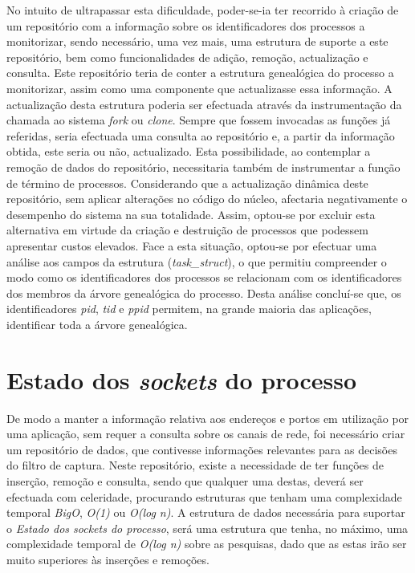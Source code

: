 No intuito de ultrapassar esta dificuldade, poder-se-ia ter recorrido à criação de um repositório com a informação sobre os identificadores dos processos a monitorizar, sendo necessário, uma vez mais, uma estrutura de suporte a este repositório, bem como funcionalidades de adição, remoção, actualização e consulta.
Este repositório teria de conter a estrutura genealógica do processo a monitorizar, assim como uma componente que actualizasse essa informação.
A actualização desta estrutura poderia ser efectuada através da instrumentação da chamada ao sistema \textit{fork} ou \textit{clone}.
Sempre que fossem invocadas as funções já referidas, seria efectuada uma consulta ao repositório e, a partir da informação obtida, este seria ou não, actualizado.
Esta possibilidade, ao contemplar a remoção de dados do repositório, necessitaria também de instrumentar a função de término de processos.
Considerando que a actualização dinâmica deste repositório, sem aplicar alterações no código do núcleo, afectaria negativamente o desempenho do sistema na sua totalidade.
Assim, optou-se por excluir esta alternativa em virtude da criação e destruição de processos que podessem apresentar custos elevados.
Face a esta situação, optou-se por efectuar uma análise aos campos da estrutura (\textit{task\_struct}), o que permitiu compreender o modo como os identificadores dos processos se relacionam com os identificadores dos membros da árvore genealógica do processo.
Desta análise concluí-se que, os identificadores \textit{pid}, \textit{tid} e \textit{ppid} permitem, na grande maioria das aplicações, identificar toda a árvore genealógica.





\section{Estado dos \textit{sockets} do processo}

De modo a manter a informação relativa aos endereços e portos em utilização por uma aplicação, sem requer a consulta sobre os canais de rede, foi necessário criar um repositório de dados, que contivesse informações relevantes para as decisões do filtro de captura.
Neste repositório, existe a necessidade de ter funções de inserção, remoção e consulta, sendo que qualquer uma destas, deverá ser efectuada com celeridade, procurando estruturas que tenham uma complexidade temporal \textit{BigO}, \textit{O(1)} ou \textit{O(log n)}.
A estrutura de dados necessária para suportar o \textit{Estado dos sockets do processo}, será uma estrutura que tenha, no máximo, uma complexidade temporal de \textit{O(log n)} sobre as pesquisas, dado que as estas irão ser muito superiores às inserções e remoções.

